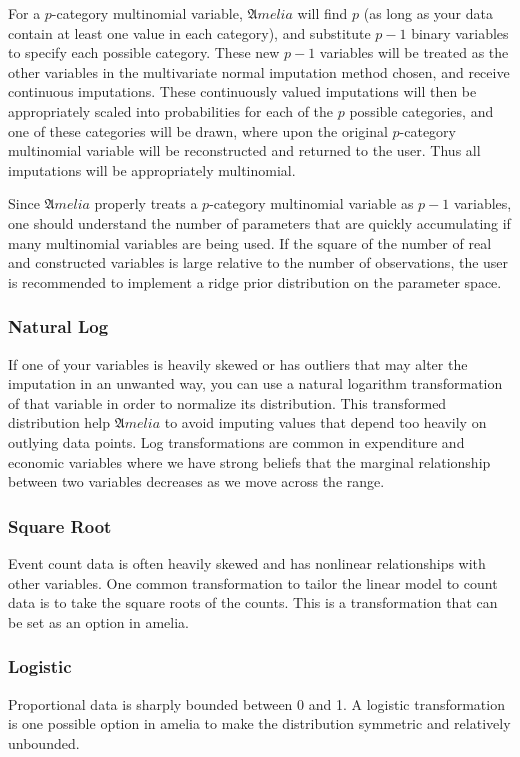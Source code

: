 \documentclass[12pt,titlepage]{article}
\begin{document}
For a $ p$-category multinomial variable, ${\mathfrak Amelia}$ will
find $ p$ (as long as your data contain at least one value in each
category), and substitute $ p-1$ binary variables to specify each
possible category. These new $ p-1$ variables will be treated as the
other variables in the multivariate normal imputation method chosen,
and receive continuous imputations. These continuously valued
imputations will then be appropriately scaled into probabilities for
each of the $ p$ possible categories, and one of these categories will
be drawn, where upon the original $ p$-category multinomial variable
will be reconstructed and returned to the user. Thus all imputations
will be appropriately multinomial.

Since ${\mathfrak Amelia}$ properly treats a $ p$-category multinomial
variable as $ p-1$ variables, one should understand the number of
parameters that are quickly accumulating if many multinomial variables
are being used. If the square of the number of real and constructed
variables is large relative to the number of observations, the user is
recommended to implement a ridge prior distribution on the parameter
space.

\subsubsection{Natural Log}
\label{sec:log}
If one of your variables is heavily skewed or has outliers that may
alter the imputation in an unwanted way, you can use a natural
logarithm transformation of that variable in order to normalize its
distribution.  This transformed distribution help ${\mathfrak Amelia}$
to avoid imputing values that depend too heavily on outlying data
points.  Log transformations are common in expenditure and economic
variables where we have strong beliefs that the marginal relationship
between two variables decreases as we move across the range.

\subsubsection{Square Root}
\label{sec:sqrt}
Event count data is often heavily skewed and has nonlinear
relationships with other variables.  One common transformation to
tailor the linear model to count data is to take the square roots of
the counts.  This is a transformation that can be set as an option in
amelia.
 
\subsubsection{Logistic}
\label{sec:lgstc}
Proportional data is sharply bounded between 0 and 1.  A logistic
transformation is one possible option in amelia to make the
distribution symmetric and relatively unbounded.
\end{document}
